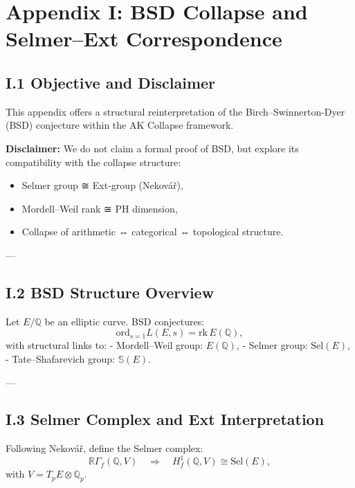 \documentclass[11pt]{article}
\newcommand{\Sha}{\mathbb{S}}
\begin{document}

\section*{Appendix I: BSD Collapse and Selmer–Ext Correspondence}

\subsection*{I.1 Objective and Disclaimer}

This appendix offers a structural reinterpretation of the Birch–Swinnerton-Dyer (BSD) conjecture  
within the AK Collapse framework.  

\textbf{Disclaimer:}  
We do not claim a formal proof of BSD, but explore its compatibility with the collapse structure:
\begin{itemize}
  \item Selmer group ≅ Ext-group (Nekovář),
  \item Mordell–Weil rank ≅ PH dimension,
  \item Collapse of arithmetic ⇔ categorical ⇔ topological structure.
\end{itemize}

---

\subsection*{I.2 BSD Structure Overview}

Let $E/\mathbb{Q}$ be an elliptic curve. BSD conjectures:
\[
\mathrm{ord}_{s=1} L(E,s) = \mathrm{rk}\,E(\mathbb{Q}),
\]
with structural links to:
- Mordell–Weil group: $E(\mathbb{Q})$,
- Selmer group: $\mathrm{Sel}(E)$,
- Tate–Shafarevich group: $\Sha(E)$.

---

\subsection*{I.3 Selmer Complex and Ext Interpretation}

Following Nekovář, define the Selmer complex:
\[
\mathbb{R}\Gamma_f(\mathbb{Q}, V) \quad \Rightarrow \quad H^1_f(\mathbb{Q}, V) \cong \mathrm{Sel}(E),
\]
with $V = T_p E \otimes \mathbb{Q}_p$.
\end{document}
